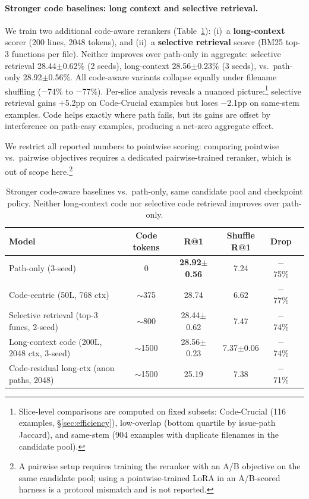 \documentclass{article}
\begin{document}
\paragraph{Stronger code baselines: long context and selective retrieval.}
We train two additional code-aware rerankers (Table~\ref{tab:strong_code_baselines}):
(i)~a \textbf{long-context} scorer (200 lines, 2048 tokens), and
(ii)~a \textbf{selective retrieval} scorer (BM25 top-3 functions per file).
Neither improves over path-only in aggregate: selective retrieval 28.44$\pm$0.62\% (2 seeds), long-context 28.56$\pm$0.23\% (3 seeds), vs.\ path-only 28.92$\pm$0.56\%.
All code-aware variants collapse equally under filename shuffling ($-$74\% to $-$77\%).
Per-slice analysis reveals a nuanced picture:\footnote{Slice-level comparisons are computed on fixed subsets: Code-Crucial (116 examples, \S\ref{sec:efficiency}), low-overlap (bottom quartile by issue-path Jaccard), and same-stem (904 examples with duplicate filenames in the candidate pool).} selective retrieval gains $+$5.2pp on Code-Crucial examples but loses $-$2.1pp on same-stem examples.
Code helps exactly where path fails, but its gains are offset by interference on path-easy examples, producing a net-zero aggregate effect.


We restrict all reported numbers to pointwise scoring: comparing pointwise vs.\ pairwise objectives requires a dedicated pairwise-trained reranker, which is out of scope here.\footnote{A pairwise setup requires training the reranker with an A/B objective on the same candidate pool; using a pointwise-trained LoRA in an A/B-scored harness is a protocol mismatch and is not reported.}

\begin{table}[h]
\centering
\caption{Stronger code-aware baselines vs.\ path-only, same candidate pool and checkpoint policy. Neither long-context code nor selective code retrieval improves over path-only.}
\label{tab:strong_code_baselines}
\small
\begin{tabular}{lccccc}
\toprule
\textbf{Model} & \textbf{Code tokens} & \textbf{R@1} & \textbf{Shuffle R@1} & \textbf{Drop} \\
\midrule
Path-only (3-seed) & 0 & \textbf{28.92$\pm$0.56} & 7.24 & $-$75\% \\
Code-centric (50L, 768 ctx) & $\sim$375 & 28.74 & 6.62 & $-$77\% \\
Selective retrieval (top-3 funcs, 2-seed) & $\sim$800 & 28.44$\pm$0.62 & 7.47 & $-$74\% \\
Long-context code (200L, 2048 ctx, 3-seed) & $\sim$1500 & 28.56$\pm$0.23 & 7.37$\pm$0.06 & $-$74\% \\
Code-residual long-ctx (anon paths, 2048) & $\sim$1500 & 25.19 & 7.38 & $-$71\% \\
\bottomrule
\end{tabular}
\end{table}
\end{document}
